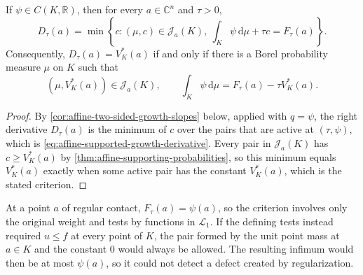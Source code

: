 \begin{theorem}\label{thm:affine-supported-growth-derivative}
If $\psi\in C(K,\mathbb R)$, then for every $a\in\mathbb C^n$ and $\tau>0$,
\begin{equation}\label{eq:affine-supported-growth-derivative}
 D_\tau(a)=\min\left\{c:(\mu,c)\in\mathcal J_a(K),
                \ \int_K\psi\,\mathrm{d}\mu+\tau c=F_\tau(a)\right\}.
\end{equation}
Consequently, $D_\tau(a)=V_K^*(a)$ if and only if there is a Borel probability measure $\mu$ on $K$ such that
\[
 (\mu,V_K^*(a))\in\mathcal J_a(K),\qquad
 \int_K\psi\,\mathrm{d}\mu=F_\tau(a)-\tau V_K^*(a).
\]
\end{theorem}
\begin{proof}
By \cref{cor:affine-two-sided-growth-slopes} below, applied with $q=\psi$, the right derivative $D_\tau(a)$ is the minimum of $c$ over the pairs that are active at $(\tau,\psi)$, which is \eqref{eq:affine-supported-growth-derivative}. Every pair in $\mathcal J_a(K)$ has $c\geq V_K^*(a)$ by \cref{thm:affine-supporting-probabilities}, so this minimum equals $V_K^*(a)$ exactly when some active pair has the constant $V_K^*(a)$, which is the stated criterion.
\end{proof}

At a point $a$ of regular contact, $F_\tau(a)=\psi(a)$, so the criterion involves only the original weight and tests by functions in $\mathcal L_1$. If the defining tests instead required $u\leq f$ at every point of $K$, the pair formed by the unit point mass at $a\in K$ and the constant $0$ would always be allowed. The resulting infimum would then be at most $\psi(a)$, so it could not detect a defect created by regularization.





